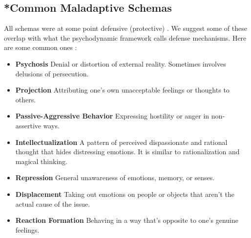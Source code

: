 \documentclass[12pt,letterpaper]{article}
\begin{document}
\subsection{*Common Maladaptive Schemas}
\label{ref:defenses}
All schemas were at some point defensive (protective) \cite{eckerUnlocking}. We suggest some of these overlap with what the psychodynamic framework calls defense mechanisms. Here are some common ones \cite{vaillantAdaptation}:

\begin{itemize}
    \item \textbf{Psychosis} Denial or distortion of external reality. Sometimes involves delusions of persecution.
    
    \item \textbf{Projection} Attributing one's own unacceptable feelings or thoughts to others.
    \item \textbf{Passive-Aggressive Behavior} Expressing hostility or anger in non-assertive ways.
    
    \item \textbf{Intellectualization} A pattern of perceived dispassionate and rational thought that hides distressing emotions. It is similar to rationalization and magical thinking.
    \item \textbf{Repression} General unawareness of emotions, memory, or senses.
    \item \textbf{Displacement} Taking out emotions on people or objects that aren't the actual cause of the issue.
    \item \textbf{Reaction Formation} Behaving in a way that's opposite to one's genuine feelings.
\end{itemize}
\end{document}

